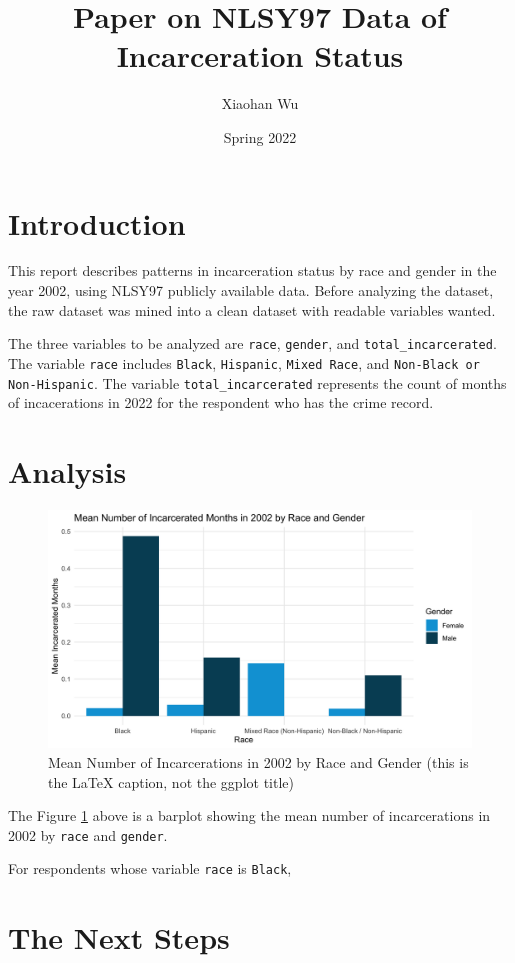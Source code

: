 \documentclass{article}
\author{Xiaohan Wu}
\title{Paper on NLSY97 Data of Incarceration Status}
\date{Spring 2022}
\begin{document}
\maketitle

\section{Introduction}

This report describes patterns in incarceration status by race and gender in the year 2002, using NLSY97 publicly available data. Before analyzing the dataset, the raw dataset was mined into a clean dataset with readable variables wanted.

The three variables to be analyzed are \texttt{race}, \texttt{gender}, and \texttt{total\_incarcerated}. The variable \texttt{race} includes \texttt{Black}, \texttt{Hispanic}, \texttt{Mixed Race}, and \texttt{Non-Black or Non-Hispanic}. The variable \texttt{total\_incarcerated} represents the count of months of incacerations in 2022 for the respondent who has the crime record.

\section{Analysis}

\begin{figure}[H]
    \begin{center}
        \includegraphics[width=.85\textwidth]{incarcerations_by_racegender}
    \end{center}
    \caption{Mean Number of Incarcerations in 2002 by Race and Gender (this is the LaTeX caption, not the ggplot title)}
    \label{fig:graph}
\end{figure}

The Figure \ref{fig:graph} above is a barplot showing the mean number of incarcerations in 2002 by \texttt{race} and \texttt{gender}.

For respondents whose variable \texttt{race} is \texttt{Black}, 






\section{The Next Steps}
\end{document}
